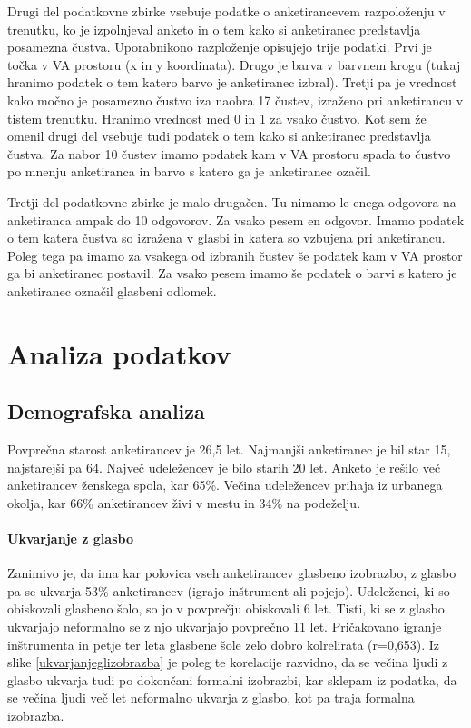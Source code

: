 \documentclass[a4paper, 12pt]{book}
\begin{document}
{Drugi del podatkovne zbirke vsebuje podatke o anketirancevem razpoloženju v trenutku, ko je izpolnjeval anketo in o tem kako si anketiranec predstavlja posamezna čustva. Uporabnikono razploženje opisujejo trije podatki. Prvi je točka v VA prostoru (x in y koordinata). Drugo je barva v barvnem krogu (tukaj hranimo podatek o tem katero barvo je  anketiranec izbral). Tretji pa je vrednost kako močno je posamezno čustvo iza naobra 17 čustev, izraženo pri anketirancu v tistem trenutku. Hranimo vrednost med 0 in 1 za vsako čustvo. Kot sem že omenil drugi del vsebuje tudi podatek o tem kako si anketiranec predstavlja čustva. Za nabor 10 čustev imamo podatek kam v VA prostoru spada to čustvo po mnenju anketiranca in barvo s katero ga je anketiranec ozačil. 

Tretji del podatkovne zbirke je malo drugačen. Tu nimamo le enega odgovora na anketiranca ampak do 10 odgovorov. Za vsako pesem en odgovor. Imamo podatek o tem katera čustva so izražena v glasbi in katera so vzbujena pri anketirancu. Poleg tega pa imamo za vsakega od izbranih čustev še podatek kam v VA prostor ga bi anketiranec postavil. Za vsako pesem imamo še podatek o barvi s katero je anketiranec označil glasbeni odlomek.  

\section{Analiza podatkov}

\subsection{Demografska analiza}

Povprečna starost anketirancev je 26,5 let. Najmanjši anketiranec je bil star 15, najstarejši pa 64. Največ udeležencev je bilo starih 20 let. Anketo je rešilo več anketirancev ženskega spola, kar 65\%. Večina udeležencev prihaja iz urbanega okolja, kar 66\% anketirancev živi v mestu in 34\% na podeželju.

\paragraph{Ukvarjanje z glasbo}

Zanimivo je, da ima kar polovica vseh anketirancev glasbeno izobrazbo, z glasbo pa se ukvarja 53\% anketirancev (igrajo inštrument ali pojejo). Udeleženci, ki so obiskovali glasbeno šolo, so jo v povprečju obiskovali 6 let. Tisti, ki se z glasbo ukvarjajo neformalno se z njo ukvarjajo povprečno 11 let. Pričakovano igranje inštrumenta in petje ter leta glasbene šole zelo dobro kolrelirata (r=0,653). Iz slike \ref{ukvarjanjeglizobrazba} je poleg te korelacije razvidno, da se večina ljudi z glasbo ukvarja tudi po dokončani formalni izobrazbi, kar sklepam iz podatka, da se večina ljudi več let neformalno ukvarja z glasbo, kot pa traja formalna izobrazba. 

}
\end{document}
